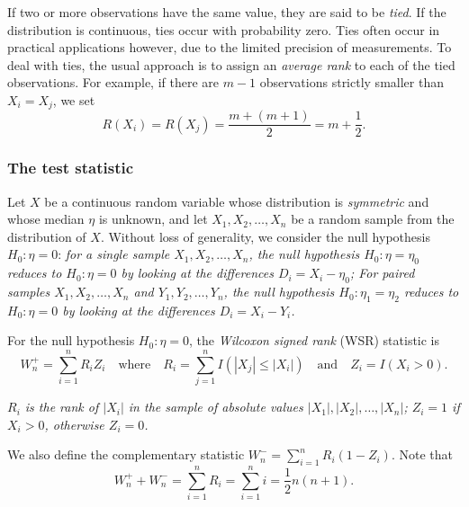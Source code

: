 \begin{remark}[Ties]
If two or more observations have the same value, they are said to be \emph{tied}. If the distribution is continuous, ties occur with probability zero. Ties often occur in practical applications however, due to the limited precision of measurements. To deal with ties, the usual approach is to assign an \emph{average rank} to each of the tied observations. For example, if there are $m-1$ observations strictly smaller than $X_i=X_j$, we set
\[
R(X_i) = R(X_j) = \frac{m+(m+1)}{2} = m+\frac{1}{2}.
\]
\end{remark}

\subsubsection{The test statistic}

Let $X$ be a continuous random variable whose distribution is \emph{symmetric} and whose median $\eta$ is unknown, and let $X_1,X_2,\ldots,X_n$ be a random sample from the distribution of $X$. 
Without loss of generality, we consider the null hypothesis $H_0:\eta=0$:
\bit
\it for a single sample $X_1,X_2,\ldots,X_n$, the null hypothesis $H_0:\eta=\eta_0$ reduces to $H_0:\eta=0$ by looking at the differences $D_i = X_i - \eta_0$;
\it For paired samples $X_1,X_2,\ldots,X_n$ and $Y_1,Y_2,\ldots,Y_n$, the null hypothesis $H_0:\eta_1=\eta_2$ reduces to $H_0:\eta=0$ by looking at the differences $D_i = X_i - Y_i$.
\eit

\begin{definition}
For the null hypothesis $H_0:\eta=0$, the \emph{Wilcoxon signed rank} (WSR) statistic is 
\[
W^{+}_n = \sum_{i=1}^n R_i Z_i \quad\text{where}\quad R_i = \sum_{j=1}^n I(|X_j|\leq |X_i|) \quad\text{and}\quad Z_i=I(X_i>0).
\]
\end{definition}
\bit
\it $R_i$ is the rank of $|X_i|$ in the sample of absolute values $|X_1|,|X_2|,\ldots,|X_n|$;
\it $Z_i=1$ if $X_i>0$, otherwise $Z_i=0$.
\eit

We also define the complementary statistic $W^{-}_n = \displaystyle\sum_{i=1}^n R_i(1-Z_i)$. Note that
\[
W^{+}_n + W^{-}_n = \sum_{i=1}^n R_i = \sum_{i=1}^n i = \frac{1}{2}n(n+1).
\]


